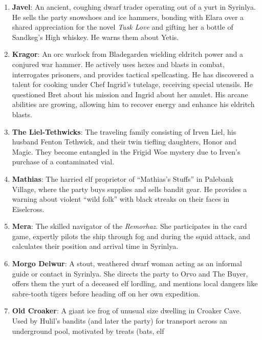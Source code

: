 \documentclass[
  letterpaper,12pt,twoside,twocolumn,openany,
  nodeprecatedcode,bg=full]{dndbook}
\begin{document}
\begin{enumerate}
  his husband Fenton and their twin tiefling daughters. He purchased a
  cracked blue vial containing Frigid Woe contagion from Hulil Lutan as
  an investment. He cooperates with the party, allowing Scarlet to
  confirm the danger, and now relies on them finding the cure for him
  and his entire family.
\item
  \textbf{Javel}: An ancient, coughing dwarf trader operating out of a
  yurt in Syrinlya. He sells the party snowshoes and ice hammers,
  bonding with Elara over a shared appreciation for the novel \emph{Tusk
  Love} and gifting her a bottle of Sandkeg's High whiskey. He warns
  them about Yetis.
\item
  \textbf{Kragor}: An orc warlock from Bladegarden wielding eldritch
  power and a conjured war hammer. He actively uses hexes and blasts in
  combat, interrogates prisoners, and provides tactical spellcasting. He
  has discovered a talent for cooking under Chef Ingrid's tutelage,
  receiving special utensils. He questioned Bret about his mission and
  Ingrid about her amulet. His arcane abilities are growing, allowing
  him to recover energy and enhance his eldritch blasts.
\item
  \textbf{The Liel-Tethwicks}: The traveling family consisting of Irven
  Liel, his husband Fenton Tethwick, and their twin tiefling daughters,
  Honor and Magic. They become entangled in the Frigid Woe mystery due
  to Irven's purchase of a contaminated vial.
\item
  \textbf{Mathias}: The harried elf proprietor of ``Mathias's Stuffs''
  in Palebank Village, where the party buys supplies and sells bandit
  gear. He provides a warning about violent ``wild folk'' with black
  streaks on their faces in Eiselcross.
\item
  \textbf{Mera}: The skilled navigator of the \emph{Remorhaz}. She
  participates in the card game, expertly pilots the ship through fog
  and during the squid attack, and calculates their position and arrival
  time in Syrinlya.
\item
  \textbf{Morgo Delwur}: A stout, weathered dwarf woman acting as an
  informal guide or contact in Syrinlya. She directs the party to Orvo
  and The Buyer, offers them the yurt of a deceased elf lordling, and
  mentions local dangers like sabre-tooth tigers before heading off on
  her own expedition.
\item
  \textbf{Old Croaker}: A giant ice frog of unusual size dwelling in
  Croaker Cave. Used by Hulil's bandits (and later the party) for
  transport across an underground pool, motivated by treats (bats, elf

\end{enumerate}
\end{document}
